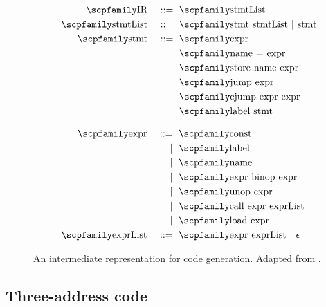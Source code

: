 \documentclass[
  oneside,
  english,
  coorientadorbanca,
  noabntexcite
]{ufsc-thesis-rn46-2019}
\def\bnfdef{::=}
\newcommand{\code}[1]{\text{\scpfamily\setlength\spaceskip{0.35em}#1}}
\newcommand{\bnfor}[1]{{$\mid$} #1}
\newcommand{\bnfmore}[1]{            & \ & \mid{}    & \ \code{#1}}
\newcommand{\astprod}[2]{\code{#1} & \ & \bnfdef{} & \ \code{#2}}
\newcommand{\astmore}[1]{\bnfmore{#1}}
\begin{document}
\begin{figure}[ht]
  \centering
  \begin{subfigure}[b]{0.4\textwidth}
    \begin{alignat*}{2}
      \astprod{IR}{stmtList}                         \\
      \astprod{stmtList}{stmt stmtList \bnfor{stmt}} \\
      \astprod{stmt}{expr}                           \\
      \astmore{name = expr}                          \\
      \astmore{store name expr}                      \\
      \astmore{jump expr}                            \\
      \astmore{cjump expr expr}                      \\
      \astmore{label stmt}
    \end{alignat*}
  \end{subfigure}
  \quad
  \begin{subfigure}[b]{0.4\textwidth}
    \begin{alignat*}{2}
      \astprod{expr}{const}        \\
      \astmore{label}              \\
      \astmore{name}               \\
      \astmore{expr binop expr}    \\
      \astmore{unop expr}          \\
      \astmore{call expr exprList} \\
      \astmore{load expr}          \\
      \astprod{exprList}{expr exprList \bnfor{$\epsilon$}}
    \end{alignat*}
  \end{subfigure}
  \caption{
    An intermediate representation for code generation.
    Adapted from \textcite{appel2003modern}.
  }\label{fig:codegen_ir}
\end{figure}


\subsection{Three-address code}
\end{document}
